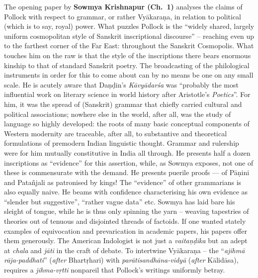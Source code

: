 The opening paper by {\bf Sowmya Krishnapur (Ch.~1)} analyses the claims of Pollock with respect to grammar, or rather Vyākaraṇa, in relation to political (which is to say, royal) power. What puzzles Pollock is the “widely shared, largely uniform cosmopolitan style of Sanskrit inscriptional discourse” -- reaching even up to the farthest corner of the Far East: throughout the Sanskrit Cosmopolis. What touches him on the raw is that the style of the inscriptions there bears enormous kinship to that of standard Sanskrit poetry. The broadcasting of the philological instruments in order for this to come about can by no means be one on any small scale. He is acutely aware that Daṇḍin’s {\sl Kāvyādarśa} was “probably the most influential work on literary science in world history after Aristotle’s {\sl Poetics}”. For him, it was the spread of (Sanskrit) grammar that chiefly carried cultural and political associations; nowhere else in the world, after all, was the study of language so highly developed: the roots of many basic conceptual components of Western modernity are traceable, after all, to substantive and theoretical formulations of premodern Indian linguistic thought. Grammar and rulership were for him mutually constitutive in India all through. He presents half a dozen inscriptions as “evidence” for this assertion, while, as Sowmya exposes, not one of these is commensurate with the demand. He presents puerile proofs --- of Pāṇini and Patañjali as patronised by kings! The “evidence” of other grammarians is also equally naive. He beams with confidence characterising his own evidence as “slender but suggestive”, “rather vague data” etc. Sowmya has laid bare his sleight of tongue, while he is thus only spinning the yarn – weaving tapestries of theories out of tenuous and disjointed threads of factoids. If one wanted stately examples of equivocation and prevarication in academic papers, his papers offer them generously. The American Indologist is not just a {\sl vaitaṇḍika} but an adept at {\sl chala} and {\sl jāti} in the craft of debate. To intertwine Vyākaraṇa -- the “{\sl ajihmā rāja-paddhati}” ({\sl after} Bhartṛhari) with {\sl parātisandhāna-vidyā} ({\sl after} Kālidāsa), requires a {\sl jihma-vṛtti} nonpareil that Pollock’s writings uniformly betray.
\vskip 6pt

